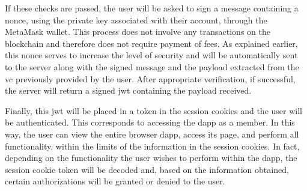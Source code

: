 If these checks are passed, the user will be asked to sign a message containing a \gls{nonce}, using the private key associated with their account, through the MetaMask wallet. 
This process does not involve any transactions on the blockchain and therefore does not require payment of fees. As explained earlier, this \gls{nonce} serves to increase the 
level of security and will be automatically sent to the server along with the signed message and the payload extracted from the \gls{vc} previously provided by the user. After 
appropriate verification, if successful, the server will return a signed \gls{jwt} containing the payload received.

Finally, this \gls{jwt} will be placed in a token in the session cookies and the user will be authenticated. This corresponds to accessing the \gls{dapp} as a member. In this 
way, the user can view the entire browser \gls{dapp}, access its page, and perform all functionality, within the limits of the information in the session cookies. In fact, 
depending on the functionality the user wishes to perform within the \gls{dapp}, the session cookie token will be decoded and, based on the information obtained, certain 
authorizations will be granted or denied to the user. 

